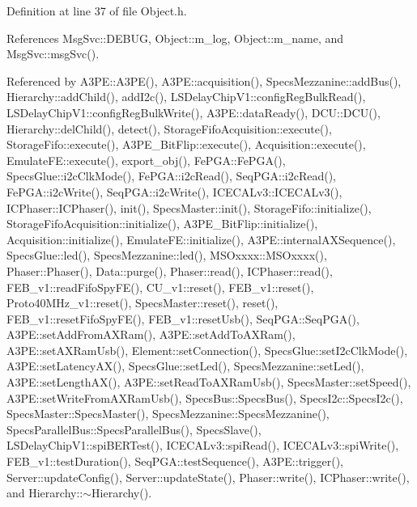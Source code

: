 Definition at line 37 of file Object.\+h.



References Msg\+Svc\+::\+D\+E\+B\+UG, Object\+::m\+\_\+log, Object\+::m\+\_\+name, and Msg\+Svc\+::msg\+Svc().



Referenced by A3\+P\+E\+::\+A3\+P\+E(), A3\+P\+E\+::acquisition(), Specs\+Mezzanine\+::add\+Bus(), Hierarchy\+::add\+Child(), add\+I2c(), L\+S\+Delay\+Chip\+V1\+::config\+Reg\+Bulk\+Read(), L\+S\+Delay\+Chip\+V1\+::config\+Reg\+Bulk\+Write(), A3\+P\+E\+::data\+Ready(), D\+C\+U\+::\+D\+C\+U(), Hierarchy\+::del\+Child(), detect(), Storage\+Fifo\+Acquisition\+::execute(), Storage\+Fifo\+::execute(), A3\+P\+E\+\_\+\+Bit\+Flip\+::execute(), Acquisition\+::execute(), Emulate\+F\+E\+::execute(), export\+\_\+obj(), Fe\+P\+G\+A\+::\+Fe\+P\+G\+A(), Specs\+Glue\+::i2c\+Clk\+Mode(), Fe\+P\+G\+A\+::i2c\+Read(), Seq\+P\+G\+A\+::i2c\+Read(), Fe\+P\+G\+A\+::i2c\+Write(), Seq\+P\+G\+A\+::i2c\+Write(), I\+C\+E\+C\+A\+Lv3\+::\+I\+C\+E\+C\+A\+Lv3(), I\+C\+Phaser\+::\+I\+C\+Phaser(), init(), Specs\+Master\+::init(), Storage\+Fifo\+::initialize(), Storage\+Fifo\+Acquisition\+::initialize(), A3\+P\+E\+\_\+\+Bit\+Flip\+::initialize(), Acquisition\+::initialize(), Emulate\+F\+E\+::initialize(), A3\+P\+E\+::internal\+A\+X\+Sequence(), Specs\+Glue\+::led(), Specs\+Mezzanine\+::led(), M\+S\+Oxxxx\+::\+M\+S\+Oxxxx(), Phaser\+::\+Phaser(), Data\+::purge(), Phaser\+::read(), I\+C\+Phaser\+::read(), F\+E\+B\+\_\+v1\+::read\+Fifo\+Spy\+F\+E(), C\+U\+\_\+v1\+::reset(), F\+E\+B\+\_\+v1\+::reset(), Proto40\+M\+Hz\+\_\+v1\+::reset(), Specs\+Master\+::reset(), reset(), F\+E\+B\+\_\+v1\+::reset\+Fifo\+Spy\+F\+E(), F\+E\+B\+\_\+v1\+::reset\+Usb(), Seq\+P\+G\+A\+::\+Seq\+P\+G\+A(), A3\+P\+E\+::set\+Add\+From\+A\+X\+Ram(), A3\+P\+E\+::set\+Add\+To\+A\+X\+Ram(), A3\+P\+E\+::set\+A\+X\+Ram\+Usb(), Element\+::set\+Connection(), Specs\+Glue\+::set\+I2c\+Clk\+Mode(), A3\+P\+E\+::set\+Latency\+A\+X(), Specs\+Glue\+::set\+Led(), Specs\+Mezzanine\+::set\+Led(), A3\+P\+E\+::set\+Length\+A\+X(), A3\+P\+E\+::set\+Read\+To\+A\+X\+Ram\+Usb(), Specs\+Master\+::set\+Speed(), A3\+P\+E\+::set\+Write\+From\+A\+X\+Ram\+Usb(), Specs\+Bus\+::\+Specs\+Bus(), Specs\+I2c\+::\+Specs\+I2c(), Specs\+Master\+::\+Specs\+Master(), Specs\+Mezzanine\+::\+Specs\+Mezzanine(), Specs\+Parallel\+Bus\+::\+Specs\+Parallel\+Bus(), Specs\+Slave(), L\+S\+Delay\+Chip\+V1\+::spi\+B\+E\+R\+Test(), I\+C\+E\+C\+A\+Lv3\+::spi\+Read(), I\+C\+E\+C\+A\+Lv3\+::spi\+Write(), F\+E\+B\+\_\+v1\+::test\+Duration(), Seq\+P\+G\+A\+::test\+Sequence(), A3\+P\+E\+::trigger(), Server\+::update\+Config(), Server\+::update\+State(), Phaser\+::write(), I\+C\+Phaser\+::write(), and Hierarchy\+::$\sim$\+Hierarchy().


